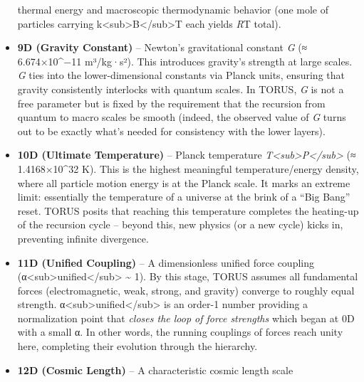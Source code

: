 \documentclass[
]{article}
\begin{document}
\begin{itemize}
  thermal energy and macroscopic thermodynamic behavior (one mole of
  particles carrying
  k\textless sub\textgreater B\textless/sub\textgreater T each yields
  \emph{R}T total)\hspace{0pt}.
\item
  \textbf{9D (Gravity Constant)} -- Newton's gravitational constant
  \emph{G} (≈ 6.674×10\^{}−11 m³/kg·s²)\hspace{0pt}. This introduces
  gravity's strength at large scales. \emph{G} ties into the
  lower-dimensional constants via Planck units, ensuring that gravity
  consistently interlocks with quantum scales\hspace{0pt}. In TORUS,
  \emph{G} is not a free parameter but is fixed by the requirement that
  the recursion from quantum to macro scales be smooth (indeed, the
  observed value of \emph{G} turns out to be exactly what's needed for
  consistency with the lower layers)\hspace{0pt}.
\item
  \textbf{10D (Ultimate Temperature)} -- Planck temperature
  \emph{T\textless sub\textgreater P\textless/sub\textgreater{}} (≈
  1.4168×10\^{}32 K)\hspace{0pt}. This is the highest meaningful
  temperature/energy density, where all particle motion energy is at the
  Planck scale. It marks an extreme limit: essentially the temperature
  of a universe at the brink of a ``Big Bang'' reset. TORUS posits that
  reaching this temperature completes the heating-up of the recursion
  cycle\hspace{0pt} -- beyond this, new physics (or a new cycle) kicks
  in, preventing infinite divergence.
\item
  \textbf{11D (Unified Coupling)} -- A dimensionless unified force
  coupling
  (α\textless sub\textgreater unified\textless/sub\textgreater{}
  \textasciitilde{} 1)\hspace{0pt}. By this stage, TORUS assumes all
  fundamental forces (electromagnetic, weak, strong, and gravity)
  converge to roughly equal strength.
  α\textless sub\textgreater unified\textless/sub\textgreater{} is an
  order-1 number providing a normalization point that \emph{closes the
  loop of force strengths} which began at 0D with a small α. In other
  words, the running couplings of forces reach unity here, completing
  their evolution through the hierarchy\hspace{0pt}.
\item
  \textbf{12D (Cosmic Length)} -- A characteristic cosmic length scale

\end{itemize}
\end{document}
